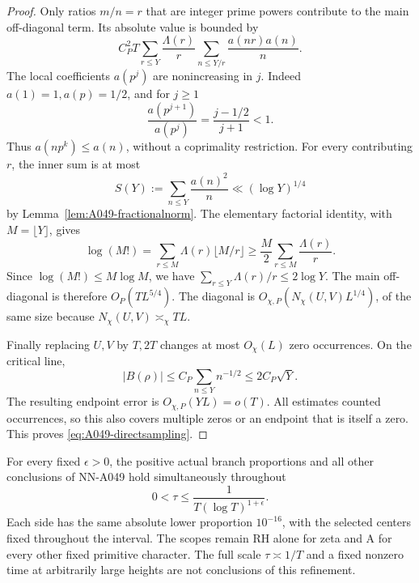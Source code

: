 \begin{proof}
Only ratios \(m/n=r\) that are integer prime powers contribute
to the main off-diagonal term. Its absolute value is bounded by
\[
 C_P^2 T\sum_{r\le Y}\frac{\Lambda(r)}r
                     \sum_{n\le Y/r}\frac{a(nr)a(n)}n.
\]
The local coefficients \(a(p^j)\) are nonincreasing in \(j\).
Indeed \(a(1)=1,a(p)=1/2\), and for \(j\ge1\)
\[
             \frac{a(p^{j+1})}{a(p^j)}
                           =\frac{j-1/2}{j+1}<1.
\]
Thus \(a(np^k)\le a(n)\), without a coprimality restriction.
For every contributing \(r\), the inner sum is at most
\[
                 S(Y):=\sum_{n\le Y}\frac{a(n)^2}{n}
                                   \ll(\log Y)^{1/4}
\]
by Lemma~\ref{lem:A049-fractionalnorm}.
The elementary factorial identity, with \(M=\lfloor Y\rfloor\),
gives
\[
 \log(M!)=\sum_{r\le M}\Lambda(r)\lfloor M/r\rfloor
       \ge\frac M2\sum_{r\le M}\frac{\Lambda(r)}r.
\]
Since \(\log(M!)\le M\log M\), we have
\(\sum_{r\le Y}\Lambda(r)/r\le2\log Y\).
The main off-diagonal is therefore \(O_P(TL^{5/4})\).
The diagonal is \(O_{\chi,P}(N_\chi(U,V)L^{1/4})\),
of the same size because \(N_\chi(U,V)\asymp_\chi TL\).

Finally replacing \(U,V\) by \(T,2T\) changes at most
\(O_\chi(L)\) zero occurrences. On the critical line,
\[
              |B(\rho)|\le C_P\sum_{n\le Y}n^{-1/2}
                                      \le2C_P\sqrt Y.
\]
The resulting endpoint error is \(O_{\chi,P}(YL)=o(T)\).
All estimates counted occurrences, so this also covers
multiple zeros or an endpoint that is itself a zero.
This proves \eqref{eq:A049-directsampling}.
\end{proof}

\begin{corollary}
\label{cor:A049-logarithmic-one}
For every fixed \(\epsilon>0\), the positive actual branch
proportions and all other conclusions of NN-A049 hold
simultaneously throughout
\[
                         0<\tau\le
                           \frac1{T(\log T)^{1+\epsilon}}.
\]
Each side has the same absolute lower proportion \(10^{-16}\),
with the selected centers fixed throughout the interval.
The scopes remain RH alone for zeta and A for every other
fixed primitive character. The full scale \(\tau\asymp1/T\)
and a fixed nonzero time at arbitrarily large heights are
not conclusions of this refinement.
\end{corollary}


